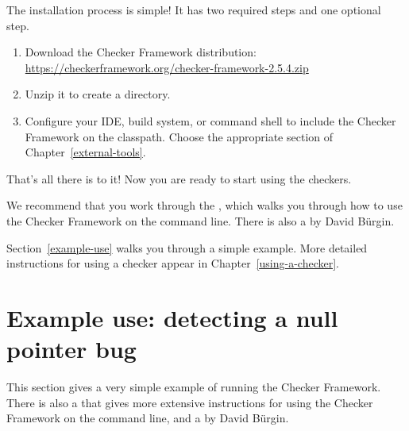 The installation process is simple!  It has two required steps and one
optional step.
\begin{enumerate}
\item
  Download the Checker Framework distribution:
  \\
  \url{https://checkerframework.org/checker-framework-2.5.4.zip}

\item
  Unzip it to create a  directory.

\item
  \label{installation-configure-step}%
  Configure your IDE, build system, or command shell to include the Checker
  Framework on the classpath.  Choose the appropriate section of
  Chapter~\ref{external-tools}.


\end{enumerate}

That's all there is to it!  Now you are ready to start using the checkers.

We recommend that you work through the
, which walks you through how to use the Checker
Framework on
the command line.
There is also a
 by David B\"urgin.

Section~\ref{example-use} walks you through a simple example.  More detailed
instructions for using a checker appear in Chapter~\ref{using-a-checker}.



\section{Example use:  detecting a null pointer bug\label{example-use}}

This section gives a very simple example of running the Checker Framework.
There is also a 
that gives more extensive instructions for using the Checker Framework
on the command line,
and a
 by David B\"urgin.

%
%
%
%
%
%


